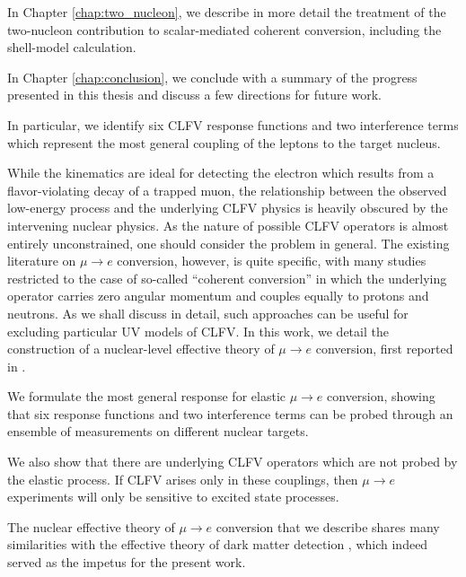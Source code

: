 \documentclass{book}[letterpaper,12pt]
\begin{document}
In Chapter \ref{chap:two_nucleon}, we describe in more detail the treatment of the two-nucleon contribution to scalar-mediated coherent conversion, including the shell-model calculation.

In Chapter \ref{chap:conclusion}, we conclude with a summary of the progress presented in this thesis and discuss a few directions for future work. 

In particular, we identify six CLFV response functions and two interference terms which represent the most general coupling of the leptons to the target nucleus.
 
While the kinematics are ideal for detecting the electron which results from a flavor-violating decay of a trapped muon, the relationship between the observed low-energy process and the underlying CLFV physics is heavily obscured by the intervening nuclear physics. As the nature of possible CLFV operators is almost entirely unconstrained, one should consider the problem in general. The existing literature on $\mu\rightarrow e$ conversion, however, is quite specific, with many studies restricted to the case of so-called ``coherent conversion'' in which the underlying operator carries zero angular momentum and couples equally to protons and neutrons. As we shall discuss in detail, such approaches can be useful for excluding particular UV models of CLFV. In this work, we detail the construction of a nuclear-level effective theory of $\mu\rightarrow e$ conversion, first reported in \cite{rule2021nucleonlevel}. 

 We formulate the most general response for elastic $\mu\rightarrow e$ conversion, showing that six response functions and two interference terms can be probed through an ensemble of measurements on different nuclear targets. 
 
We also show that there are underlying CLFV operators which are not probed by the elastic process. If CLFV arises only in these couplings, then $\mu\rightarrow e$ experiments will only be sensitive to excited state processes.

The nuclear effective theory of $\mu\rightarrow e$ conversion that we describe shares many similarities with the effective theory of dark matter detection \cite{Fitzpatrick_2013}, which indeed served as the impetus for the present work.
\end{document}
